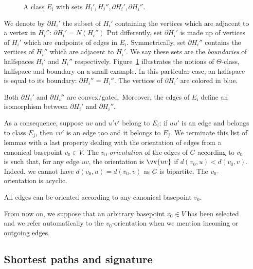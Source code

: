 \documentclass[a4paper,UKenglish,numberwithinsect,cleveref, autoref]{lipics-v2021}
\begin{document}
\begin{figure}[h]
\centering
\scalebox{0.7}{}
\caption{A class $E_i$ with sets $H_i', H_i'', \partial H_i', \partial H_i''$.}
\label{fig:halfspaces}
\end{figure}

We denote by $\partial H_i'$ the subset of $H_i'$ containing the vertices which are adjacent to a vertex in $H_i''$: $\partial H_i' = N(H_i'')$ Put differently, set $\partial H_i'$ is made up of vertices of $H_i'$ which are endpoints of edges in $E_i$. Symmetrically, set $\partial H_i''$ contains the vertices of $H_i''$ which are adjacent to $H_i'$. We say these sets are the \textit{boundaries} of halfspaces $H_i'$ and $H_i''$ respectively. Figure~\ref{fig:halfspaces} illustrates the notions of $\Theta$-class, halfspace and boundary on a small example. In this particular case, an halfspace is equal to its boundary: $\partial H_i'' = H_i''$. The vertices of $\partial H_i'$ are colored in blue.

\begin{lemma}
Both $\partial H_i'$ and $\partial H_i''$ are convex/gated. Moreover, the edges of $E_i$ define an isomorphism between $\partial H_i'$ and $\partial H_i''$.
\label{le:boundaries}
\end{lemma}


As a consequence, suppose $uv$ and $u'v'$ belong to $E_i$: if $uu'$ is an edge and belongs to class $E_j$, then $vv'$ is an edge too and it belongs to $E_j$. We terminate this list of lemmas with a last property dealing with the orientation of edges  from a canonical basepoint $v_0 \in V$. The \textit{$v_0$-orientation} of the edges of $G$ according to $v_0$ is such that, for any edge $uv$, the orientation is $\vv{uv}$ if $d(v_0,u) < d(v_0,v)$. Indeed, we cannot have $d(v_0,u) = d(v_0,v)$ as $G$ is bipartite. The $v_0$-orientation is acyclic.

\begin{lemma}
All edges can be oriented according to any canonical basepoint $v_0$.
\end{lemma}

From now on, we suppose that an arbitrary basepoint $v_0 \in V$ has been selected and we refer automatically to the $v_0$-orientation when we mention incoming or outgoing edges.

\subsection{Shortest paths and signature} \label{subsec:signature}
\end{document}

